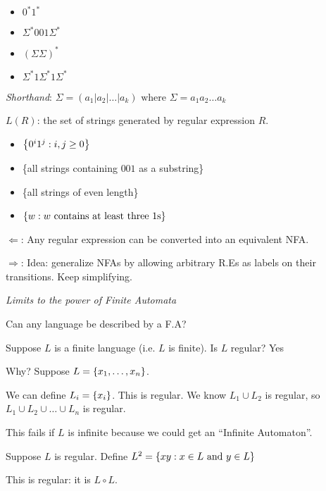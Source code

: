 \begin{itemize}
    \item $0^*1^*$
    \item $\Sigma^*001\Sigma^*$
    \item $(\Sigma\Sigma)^*$
    \item $\Sigma^*1\Sigma^*1\Sigma^*$
\end{itemize}

\emph{Shorthand}: $\Sigma = (a_1|a_2|\ldots|a_k) \text{ where } \Sigma  = a_1a_2\ldots a_k$

$L(R)$: the set of strings generated by regular expression $R$.

\begin{itemize}
  \item $\left \{ 0^i1^j: i, j \geq 0 \right \}$
  \item \{all strings containing $001$ as a substring\}
  \item \{all strings of even length\}
  \item $\left \{ w: w \text{ contains at least three 1s} \right \}$
\end{itemize}

$\Leftarrow$: Any regular expression can be converted into an equivalent NFA.

$\Rightarrow$: Idea: generalize NFAs by allowing arbitrary R.Es as labels on their transitions. Keep simplifying.

\emph{Limits to the power of Finite Automata}

Can any language be described by a F.A?

\begin{example}
    Suppose $L$ is a finite language (i.e. $L$ is finite). Is $L$ regular? Yes

    Why? Suppose $L = \left \{ x_1, \ldots, x_n \right \}$.

    We can define $L_i = \left \{ x_i \right \}$. This is regular. We know $L_1 \cup L_2$ is regular, so $L_1 \cup L_2 \cup \ldots \cup L_n$ is regular.

    This fails if $L$ is infinite because we could get an ``Infinite Automaton''.
\end{example}

\begin{example}
    Suppose $L$ is regular. Define $L^2 = \left \{ xy: x \in L \text{ and } y \in L \right \}$

    This is regular: it is $L \circ L$.
\end{example}

